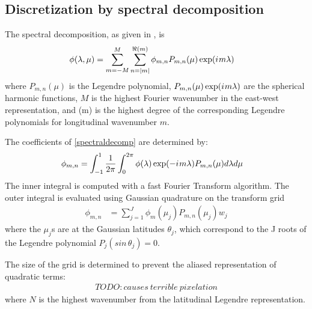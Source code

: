 \documentclass[a4paper, 12pt, notitlepage]{report}
\newcommand\abs[1]{\left|#1\right|}
\newcommand{\iu}{{i\mkern1mu}}
\begin{document}
  \subsection{Discretization by spectral decomposition}
  The spectral decomposition, as given in \cite{jakob1995spectral}, is
  \begin{equation} \label{spectraldecomp}
    \begin{split}
      \phi(\lambda,\mu) &= \sum_{m=-M}^{M}
      \sum_{n=\abs{m}}^{\Re(m)}\phi_{m,n}P_{m,n}(\mu)\exp(\iu m \lambda)
    \end{split}
  \end{equation}
  where \(P_{m,n}(\mu)\) is the Legendre polynomial, \(P_{m,n}(\mu)\exp(\iu m
  \lambda)\) are the spherical harmonic functions, \(M\) is the highest Fourier
  wavenumber in the east-west representation, and \Re(m) is the highest degree
  of the corresponding Legendre polynomials for longitudinal wavenumber \(m\).
  \par
  The coefficients of \ref{spectraldecomp} are determined by:
  \begin{equation} \label{spectraldecompcoeff}
    \begin{split}
      \phi_{m,n} &= \int_{-1}^1 \frac{1}{2\pi} \int_0^{2\pi} \phi(\lambda)
      \exp(-\iu m \lambda) P_{m,n}(\mu)d\lambda d\mu
    \end{split}
  \end{equation}
  The inner integral is computed with a fast Fourier Transform algorithm. The
  outer integral is evaluated using Gaussian quadrature on the transform grid
  \begin{equation} \label{grid}
    \begin{split}
      \phi_{m,n} &= \sum_{j=1}^J\phi_m(\mu_j)P_{m,n}(\mu_j)w_j
    \end{split}
  \end{equation}
  where the \(\mu_j\)s are at the Gaussian latitudes \(\theta_j\), which
  correspond to the J roots of the Legendre polynomial \(P_j(sin\,\theta_j)=0\).
  \par
  The size of the grid is determined to prevent the aliased representation of
  quadratic terms:
  \begin{equation} \label{gridsize}
    \begin{split}
      TODO: causes\ terrible\ pixelation
    \end{split}
  \end{equation}
  where \(N\) is the highest wavenumber from the latitudinal Legendre
  representation.
\end{document}
